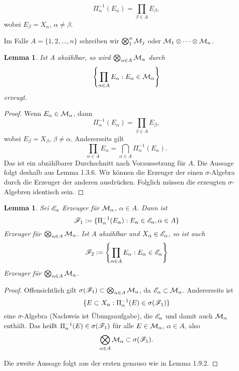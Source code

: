 \documentclass[
 a4paper,
 12pt,
 parskip=half
 ]{scrreprt}
\theoremstyle{plain}
\newtheorem{lem}[thm]{Lemma}
\theoremstyle{definition}
\numberwithin{equation}{section}
\begin{document}
\[ \Pi_\alpha^{-1} ( E_\alpha ) = \prod_{\beta \in A} E_\beta, \]
wobei $E_\beta = X_\alpha$, $\alpha \ne \beta$.
 
Im Falle $A= \{ 1, 2, \ldots, n \}$ schreiben wir $\bigotimes_1^n \mathcal{M}_j$ oder $\mathcal{M}_1 \otimes \cdots \otimes \mathcal{M}_n$.

\begin{lem}
 Ist $A$ abzählbar, so wird $\bigotimes_{\alpha \in A} \mathcal{M}_\alpha$ durch
 \[ \left\{ \prod_{\alpha \in A} E_\alpha : E_\alpha \in \mathcal{M}_\alpha \right\} \]
 erzeugt.
\end{lem}

\begin{proof}
 Wenn $E_\alpha \in \mathcal{M}_\alpha$, dann 
 \[ \Pi_\alpha^{-1}(E_\alpha) = \prod_{\beta \in A} E_\beta, \]
 wobei $E_\beta = X_\beta$, $\beta \ne \alpha$. Andererseits gilt
 \[ \prod_{\alpha \in A} E_\alpha = \bigcap_{\alpha \in A} \Pi^{-1}_\alpha (E_\alpha). \]
 Das ist ein abzählbarer Durchschnitt nach Voraussetzung für $A$. Die Aussage folgt deshalb aus Lemma 1.3.6. Wir können die Erzeuger der einen $\sigma$-Algebra durch die Erzeuger der anderen ausdrücken. Folglich müssen die erzeugten $\sigma$-Algebren identisch sein.
\end{proof}

\begin{lem}
 Sei $\mathscr{E}_\alpha$ Erzeuger für $\mathcal{M}_\alpha$, $\alpha \in A$. Dann ist
 \[ \mathscr{F}_1 := \{ \Pi_\alpha^{-1} (E_\alpha) : E_\alpha \in \mathscr{E}_\alpha, \alpha \in A \} \]
 Erzeuger für $\bigotimes_{\alpha \in A} \mathcal{M}_\alpha$. Ist $A$ abzählbar und $X_\alpha \in \mathscr{E}_\alpha$, so ist auch
 \[ \mathscr{F}_2 := \left\{ \prod_{\alpha \in A} E_\alpha : E_\alpha \in \mathscr{E}_\alpha \right\} \]
 Erzeuger für $\bigotimes_{\alpha \in A} \mathcal{M}_\alpha$.
\end{lem}

\begin{proof}
 Offensichtlich gilt $\sigma(\mathscr{F}_1) \subset \bigotimes_{\alpha \in A} \mathcal{M}_\alpha$, da $\mathscr{E}_\alpha \subset \mathcal{M}_\alpha$. Andererseits ist 
 \[ \{ E \subset X_\alpha : \Pi_\alpha^{-1} (E) \in \sigma( \mathscr{F}_1 ) \} \]
 eine $\sigma$-Algebra (Nachweis ist Übungsaufgabe), die $\mathscr{E}_\alpha$ und damit auch $\mathcal{M}_\alpha$ enthält. Das heißt $\Pi_\alpha^{-1}( E ) \in \sigma ( \mathscr{F}_1 )$ für alle $E \in \mathcal{M}_\alpha$, $\alpha \in A$, also
 \[ \bigotimes_{\alpha \in A} \mathcal{M}_\alpha \subset \sigma ( \mathscr{F}_1 ). \]
 
 Die zweite Aussage folgt aus der ersten genauso wie in Lemma 1.9.2.
\end{proof}
\end{document}
